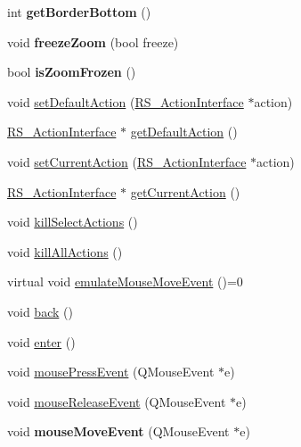 \begin{DoxyCompactItemize}
\item 
\hypertarget{classRS__GraphicView_a5f8302d5f3dfafbf830deb9f3db54255}{int {\bfseries get\-Border\-Bottom} ()}\label{classRS__GraphicView_a5f8302d5f3dfafbf830deb9f3db54255}

\item 
\hypertarget{classRS__GraphicView_abfbe46cb2a39e3319dc7eaaddbae8dfa}{void {\bfseries freeze\-Zoom} (bool freeze)}\label{classRS__GraphicView_abfbe46cb2a39e3319dc7eaaddbae8dfa}

\item 
\hypertarget{classRS__GraphicView_af7da787c1a3d5ec76e6cdcec533fc46f}{bool {\bfseries is\-Zoom\-Frozen} ()}\label{classRS__GraphicView_af7da787c1a3d5ec76e6cdcec533fc46f}

\item 
void \hyperlink{classRS__GraphicView_ab19855f3a0440cd126c9418d620b5daa}{set\-Default\-Action} (\hyperlink{classRS__ActionInterface}{R\-S\-\_\-\-Action\-Interface} $\ast$action)
\item 
\hyperlink{classRS__ActionInterface}{R\-S\-\_\-\-Action\-Interface} $\ast$ \hyperlink{classRS__GraphicView_af3873abfd15d17abf90b599642fadeae}{get\-Default\-Action} ()
\item 
void \hyperlink{classRS__GraphicView_a65251a45d7f7da8700dcd1dd410d4e80}{set\-Current\-Action} (\hyperlink{classRS__ActionInterface}{R\-S\-\_\-\-Action\-Interface} $\ast$action)
\item 
\hyperlink{classRS__ActionInterface}{R\-S\-\_\-\-Action\-Interface} $\ast$ \hyperlink{classRS__GraphicView_a1cd6ed60d8b4df412d537c1c1f1186af}{get\-Current\-Action} ()
\item 
void \hyperlink{classRS__GraphicView_ac60b852edb1441711d57fb757cadc39b}{kill\-Select\-Actions} ()
\item 
void \hyperlink{classRS__GraphicView_a44c3d2fc309d302c8c212b0b8ae89bf0}{kill\-All\-Actions} ()
\item 
virtual void \hyperlink{classRS__GraphicView_a5d4cb4b6bb21358a6c959ca30d67e22d}{emulate\-Mouse\-Move\-Event} ()=0
\item 
void \hyperlink{classRS__GraphicView_a99b34125429caa61996a79471a310b64}{back} ()
\item 
void \hyperlink{classRS__GraphicView_a9989594f1e6714929bbac3c909135a06}{enter} ()
\item 
void \hyperlink{classRS__GraphicView_a746fcad635f1b9687b41165e26a0033f}{mouse\-Press\-Event} (Q\-Mouse\-Event $\ast$e)
\item 
void \hyperlink{classRS__GraphicView_a7e4027a0cd61f4de9494a7a134982426}{mouse\-Release\-Event} (Q\-Mouse\-Event $\ast$e)
\item 
\hypertarget{classRS__GraphicView_ada84995af465506ef0491b4fa549bf0b}{void {\bfseries mouse\-Move\-Event} (Q\-Mouse\-Event $\ast$e)}\label{classRS__GraphicView_ada84995af465506ef0491b4fa549bf0b}


\end{DoxyCompactItemize}
